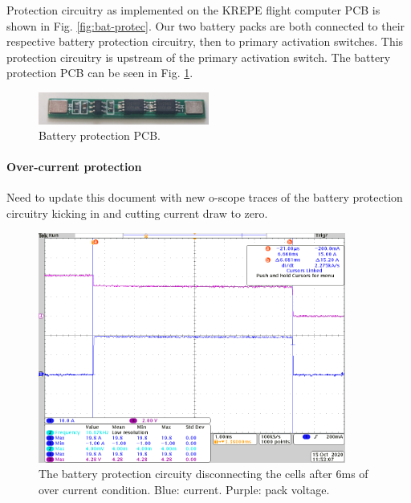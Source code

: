 \documentclass{article}
\begin{document}
Protection circuitry as implemented on the KREPE flight computer PCB is shown in Fig. \ref{fig:bat-protec}. Our two battery packs are both connected to their respective battery protection circuitry, then  to primary activation switches. This protection circuitry is upstream of the primary activation switch. The battery protection PCB can be seen in Fig. \ref{fig:bat-protect}.


\begin{figure}[H]
	\centering
	\includegraphics[width=0.5\textwidth]{images/new_batt_prot.png}
	\caption{Battery protection PCB.}
	\label{fig:bat-protect}
\end{figure}


\paragraph{Over-current protection}
Need to update this document with new o-scope traces of the battery protection circuitry kicking in and cutting current draw to zero.


\begin{figure}[H]
	\centering
	\includegraphics[width=0.9\textwidth]{images/over-current.png}
	\caption{The battery protection circuity disconnecting the cells after 6ms of over current condition. Blue: current. Purple: pack voltage.}
	\label{fig:over-current}
\end{figure}




\appendix
\end{document}
